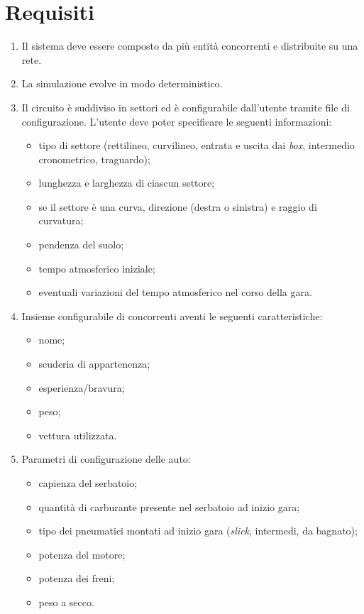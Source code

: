 \documentclass[a4paper]{report}
\begin{document}
\chapter{Requisiti}
\begin{enumerate}
\item Il sistema deve essere composto da più entità concorrenti e distribuite su una rete.
\item La simulazione evolve in modo deterministico.
\item Il circuito è suddiviso in settori ed è configurabile dall'utente tramite file di configurazione. L'utente deve poter specificare le seguenti informazioni:
	\begin{itemize}
	\item tipo di settore (rettilineo, curvilineo, entrata e uscita dai \textit{box}, intermedio cronometrico, traguardo);
	\item lunghezza e larghezza di ciascun settore;
	\item se il settore è una curva, direzione (destra o sinistra) e raggio di curvatura;
	\item pendenza del suolo;
	\item tempo atmosferico iniziale;
	\item eventuali variazioni del tempo atmosferico nel corso della gara.
	\end{itemize}
\item Insieme configurabile di concorrenti aventi le seguenti caratteristiche:
	\begin{itemize}
	\item nome;
	\item scuderia di appartenenza;
	\item esperienza/bravura;
	\item peso;
	\item vettura utilizzata.
	\end{itemize}
\item Parametri di configurazione delle auto:
	\begin{itemize}
	\item capienza del serbatoio;
	\item quantità di carburante presente nel serbatoio ad inizio gara;
	\item tipo dei pneumatici montati ad inizio gara (\textit{slick}, intermedi, da bagnato);
	\item potenza del motore;
	\item potenza dei freni;
	\item peso a secco.
	\end{itemize}

\end{enumerate}
\end{document}
